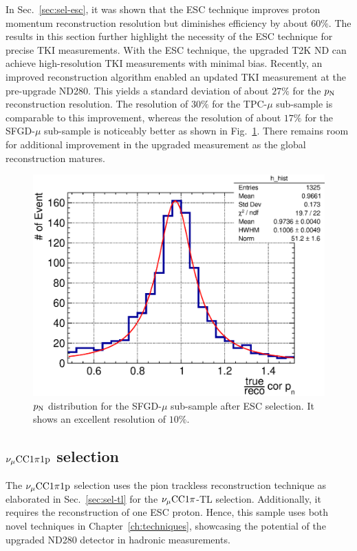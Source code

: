      In Sec.~\ref{sec:sel-esc}, it was shown that the ESC technique improves proton momentum reconstruction resolution but diminishes efficiency by about $60\%$.
     The results in this section further highlight the necessity of the ESC technique for precise TKI measurements.
     With the ESC technique, the upgraded T2K ND can achieve high-resolution TKI measurements with minimal bias.
     Recently, an improved reconstruction algorithm enabled an updated TKI measurement at the pre-upgrade ND280.
     This yields a standard deviation of about $27\%$ for the $p_\textrm{N}$ reconstruction resolution.
     The resolution of $30\%$ for the TPC-$\mu$ sub-sample is comparable to this improvement, whereas the resolution of about $17\%$ for the SFGD-$\mu$ sub-sample is noticeably better as shown in Fig.~\ref{fig:sfgmu-0pi-pn}.
     There remains room for additional improvement in the upgraded measurement as the global reconstruction matures.
     \begin{figure}
          \centering
          \includegraphics[width=\sgfigwid\textwidth]{figures/perf/tki/cor_pn_rat_hist_al11_sfgmu.eps}
          \caption{\label{fig:sfgmu-0pi-pn} $p_\textrm{N}$ distribution for the SFGD-$\mu$ sub-sample after ESC selection. It shows an excellent resolution of $10\%$.}
     \end{figure}

     \subsection{$\nu_{\mu}\textrm{CC}1\pi1\textrm{p}$ selection}
     \label{sec:mc-tki-1pi}
     The $\nu_{\mu}\textrm{CC}1\pi1\textrm{p}$ selection uses the pion trackless reconstruction technique as elaborated in Sec.~\ref{sec:sel-tl} for the $\nu_{\mu}\textrm{CC}1\pi$-TL selection.
     Additionally, it requires the reconstruction of one ESC proton.
     Hence, this sample uses both novel techniques in Chapter~\ref{ch:techniques}, showcasing the potential of the upgraded ND280 detector in hadronic measurements.

